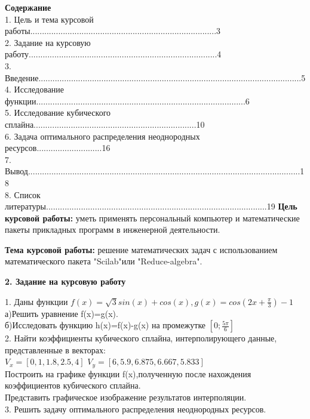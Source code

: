 \documentclass[russian,utf8,nocolumnxxxi,nocolumnxxxii]{eskdtext}
\begin{document}
\normalsize{\bf{Содержание}}
\\1. Цель и тема курсовой работы................................................................................3
\\2. Задание на курсовую работу.................................................................................4
\\3. Введение.................................................................................................................5
\\4. Исследование функции..........................................................................................6
\\5. Исследование кубического сплайна......................................................................10
\\6. Задача оптимального распределения неоднородных ресурсов............................16
\\7. Вывод.....................................................................................................................18
\\8. Список литературы...............................................................................................19
\newpage
\normalsize{\bf{Цель курсовой работы:}} уметь применять персональный компьютер и
математические пакеты прикладных программ в инженерной деятельности.
\par
\normalsize{\bf{Тема курсовой работы:}} решение математических задач с использованием
математического пакета "Scilab"или "Reduce-algebra".
\newpage
\begin{center}
 {\large\bf2. Задание на курсовую работу}
\end{center}
\normalsize1. Даны функции $f(x)=\sqrt{3}sin(x)+cos(x),g(x)=cos(2x+\frac{\pi}{3})-1$
\\а)Решить уравнение f(x)=g(x).
\\б)Исследовать функцию h(x)=f(x)-g(x) на промежутке $[0;\frac{5\pi}{6}]$
\\2. Найти коэффициенты кубического сплайна, интерполирующего данные, представленные в векторах:\\
$V_{x}=[0,1,1.8,2.5,4]$
$V_{y}=[6,5.9,6.875,6.667,5.833]$\\
Построить на графике функции f(x),полученную после нахождения коэффициентов кубического сплайна. \\
Представить графическое изображение результатов интерполяции.
\\3. Решить задачу оптимального распределения неоднородных ресурсов.
\end{document}

